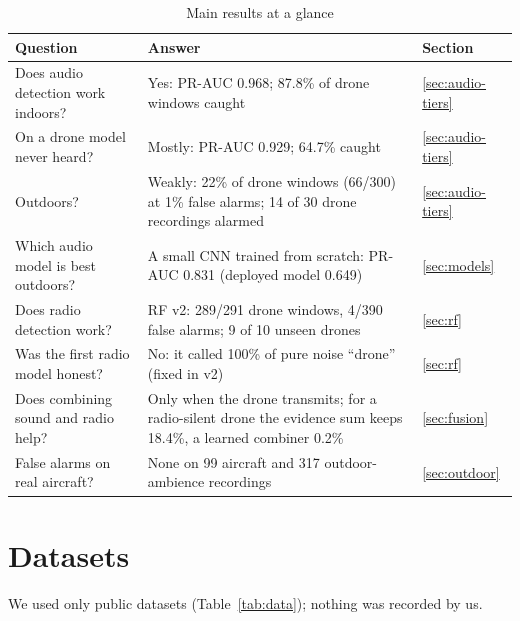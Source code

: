 \documentclass[conference,a4paper]{IEEEtran}
\begin{document}
\begin{table}[!t]
\centering\small
\caption{Main results at a glance}
\label{tab:glance}
\begin{tabularx}{\textwidth}{@{}L{5.2cm} Y L{2.8cm}@{}}
\toprule
Question & Answer & Section \\
\midrule
Does audio detection work indoors? & Yes: PR-AUC 0.968; 87.8\% of drone windows caught & \ref{sec:audio-tiers} \\
On a drone model never heard? & Mostly: PR-AUC 0.929; 64.7\% caught & \ref{sec:audio-tiers} \\
Outdoors? & Weakly: 22\% of drone windows (66/300) at 1\% false alarms; 14 of 30 drone recordings alarmed & \ref{sec:audio-tiers} \\
Which audio model is best outdoors? & A small CNN trained from scratch: PR-AUC 0.831 (deployed model 0.649) & \ref{sec:models} \\
Does radio detection work? & RF v2: 289/291 drone windows, 4/390 false alarms; 9 of 10 unseen drones & \ref{sec:rf} \\
Was the first radio model honest? & No: it called 100\% of pure noise ``drone'' (fixed in v2) & \ref{sec:rf} \\
Does combining sound and radio help? & Only when the drone transmits; for a radio-silent drone the evidence sum keeps 18.4\%, a learned combiner 0.2\% & \ref{sec:fusion} \\
False alarms on real aircraft? & None on 99 aircraft and 317 outdoor-ambience recordings & \ref{sec:outdoor} \\
\bottomrule
\end{tabularx}
\end{table}

\section{Datasets}

We used only public datasets (Table~\ref{tab:data}); nothing was recorded by us.
\end{document}
